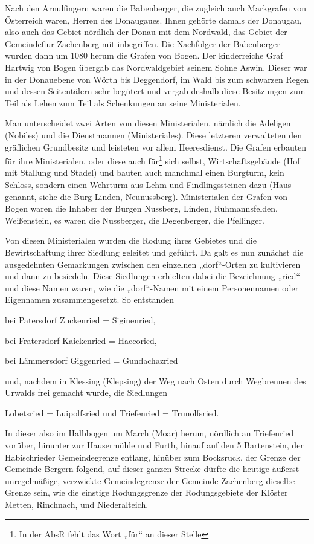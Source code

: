 \documentclass{book}
\begin{document}
Nach den Arnulfingern waren die Babenberger, die zugleich auch
Markgrafen von Österreich waren, Herren des Donaugaues. Ihnen gehörte
damals der Donaugau, also auch das Gebiet nördlich der Donau mit dem
Nordwald, das Gebiet der Gemeindeflur Zachenberg mit inbegriffen. Die
Nachfolger der Babenberger wurden dann um 1080 herum die Grafen von
Bogen. Der kinderreiche Graf Hartwig von Bogen übergab das
Nordwaldgebiet seinem Sohne Aswin. Dieser war in der Donauebene von
Wörth bis Deggendorf, im Wald bis zum schwarzen Regen und dessen
Seitentälern sehr begütert und vergab deshalb diese Besitzungen zum Teil
als Lehen zum Teil als Schenkungen an seine Ministerialen.

Man unterscheidet zwei Arten von diesen Ministerialen, nämlich die
Adeligen (Nobiles) und die Dienstmannen (Ministeriales). Diese letzteren
verwalteten den gräflichen Grundbesitz und leisteten vor allem
Heeresdienst. Die Grafen erbauten für ihre Ministerialen, oder diese
auch für\footnote{In der AbsR fehlt das Wort „für“ an dieser Stelle}
sich selbst, Wirtschaftsgebäude (Hof mit Stallung und Stadel) und bauten
auch manchmal einen Burgturm, kein Schloss, sondern einen Wehrturm aus
Lehm und Findlingssteinen dazu (Haus genannt, siehe die Burg Linden,
Neunussberg). Ministerialen der Grafen von Bogen waren die Inhaber der
Burgen Nussberg, Linden, Ruhmannsfelden, Weißenstein, es waren die
Nussberger, die Degenberger, die Pfellinger.

Von diesen Ministerialen wurden die Rodung ihres Gebietes und die
Bewirtschaftung ihrer Siedlung geleitet und geführt. Da galt es nun
zunächst die ausgedehnten Gemarkungen zwischen den einzelnen
„dorf“-Orten zu kultivieren und dann zu besiedeln. Diese Siedlungen
erhielten dabei die Bezeichnung „ried“ und diese Namen waren, wie die
„dorf“-Namen mit einem Personennamen oder Eigennamen zusammengesetzt. So
entstanden

bei Patersdorf Zuckenried = Siginenried,

bei Fratersdorf Kaickenried = Haccoried,

bei Lämmersdorf Giggenried = Gundachazried

und, nachdem in Klessing (Klepsing) der Weg nach Osten durch Wegbrennen
des Urwalds frei gemacht wurde, die Siedlungen

Lobetsried = Luipolfsried und Triefenried = Trunolfsried.

In dieser also im Halbbogen um March (Moar) herum, nördlich an
Triefenried vorüber, hinunter zur Hausermühle und Furth, hinauf auf den
5 Bartenstein, der Habischrieder Gemeindegrenze entlang, hinüber zum
Bocksruck, der Grenze der Gemeinde Bergern folgend, auf dieser ganzen
Strecke dürfte die heutige äußerst unregelmäßige, verzwickte
Gemeindegrenze der Gemeinde Zachenberg dieselbe Grenze sein, wie die
einstige Rodungsgrenze der Rodungsgebiete der Klöster Metten, Rinchnach,
und Niederalteich.
\end{document}
